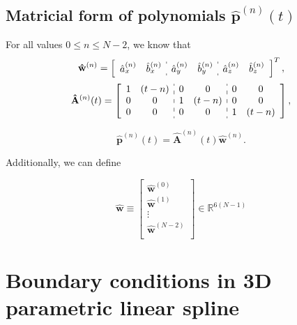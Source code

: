 \subsection{Matricial form of polynomials $\mathbf{\hat{p}}^{(n)}(t)$}
For all values $0\leq n \leq N-2$, we know that
\begin{equation}
\mathbf{\hat{w}}^{(n)}=
\left[
\begin{array}{cc:cc:cc}
\hat{a}_{x}^{(n)} & \hat{b}_{x}^{(n)} & 
\hat{a}_{y}^{(n)} & \hat{b}_{y}^{(n)} & 
\hat{a}_{z}^{(n)} & \hat{b}_{z}^{(n)} 
\end{array}
\right]^{T},
\end{equation}
\small
\begin{equation}\label{eq:hatAnt}
\mathbf{\hat{A}}^{(n)}(t)=
\left[
\begin{array}{cc:cc:cc}
1 & (t-n) &
0 & 0     &
0 & 0     \\
0 & 0     &
1 & (t-n) &
0 & 0     \\
0 & 0     &
0 & 0     &
1 & (t-n) 
\end{array}
\right],
\end{equation}
\normalsize

\begin{equation}\label{eq:hatprimeder0}
\mathbf{\hat{p}}^{(n)}(t)=
\mathbf{\hat{A}}^{(n)}(t) \mathbf{\hat{w}}^{(n)}.
\end{equation}

Additionally, we can define

\begin{equation}
\mathbf{\hat{w}}
\equiv
\begin{bmatrix}
\mathbf{\hat{w}}^{(0)}\\
\mathbf{\hat{w}}^{(1)}\\
\vdots\\
\mathbf{\hat{w}}^{(N-2)}\\
\end{bmatrix}
\in \mathbb{R}^{6(N-1)}
\end{equation}


\section{Boundary conditions in 3D parametric linear spline}\label{sec:boundarylinear}

